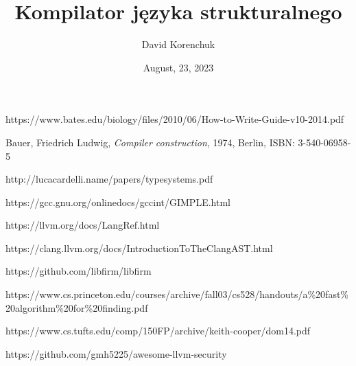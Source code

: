 \documentclass[leqno, 12pt]{article}
\title{Kompilator języka strukturalnego}
\author{David Korenchuk}
\date{August, 23, 2023}
\begin{document}
    \pagestyle{fancy}
    \lhead{\leftmark}
    \rhead{\thetitle}

    \setlength{\parindent}{0pt}

    \maketitle

	
	
	\newpage
	
	\newpage
	
	
	
	
		
	
	
	
	\newpage
	
	\newpage

	\begin{thebibliography}{9}
			https://www.bates.edu/biology/files/2010/06/How-to-Write-Guide-v10-2014.pdf

			Bauer, Friedrich Ludwig,
			\emph{Compiler construction},
			1974, Berlin,
			ISBN: 3-540-06958-5

			http://lucacardelli.name/papers/typesystems.pdf

			https://gcc.gnu.org/onlinedocs/gccint/GIMPLE.html

			https://llvm.org/docs/LangRef.html

			https://clang.llvm.org/docs/IntroductionToTheClangAST.html

			https://github.com/libfirm/libfirm

		    https://www.cs.princeton.edu/courses/archive/fall03/cs528/handouts/a\%20fast\%20algorithm\%20for\%20finding.pdf

	        https://www.cs.tufts.edu/comp/150FP/archive/keith-cooper/dom14.pdf

        	https://github.com/gmh5225/awesome-llvm-security
	\end{thebibliography}

	\newpage

    \tableofcontents
\end{document}
